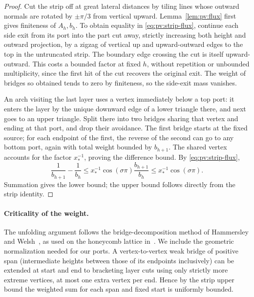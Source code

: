 \begin{proof}
Cut the strip off at great lateral distances by tiling lines whose outward normals are rotated by \(\pm\pi/3\) from vertical upward. Lemma~\ref{lem:pv:flux} first gives finiteness of \(A_h,b_h\). To obtain equality in \eqref{eq:pv:strip-flux}, continue each side exit from its port into the part cut away, strictly increasing both height and outward projection, by a zigzag of vertical up and upward-outward edges to the top in the untruncated strip. The boundary edge crossing the cut is itself upward-outward. This costs a bounded factor at fixed \(h\), without repetition or unbounded multiplicity, since the first hit of the cut recovers the original exit. The weight of bridges so obtained tends to zero by finiteness, so the side-exit mass vanishes.

An arch visiting the last layer uses a vertex immediately below a top port: it enters the layer by the unique downward edge of a lower triangle there, and next goes to an upper triangle. Split there into two bridges sharing that vertex and ending at that port, and drop their avoidance. The first bridge starts at the fixed source; for each endpoint of the first, the reverse of the second can go to any bottom port, again with total weight bounded by \(b_{h+1}\). The shared vertex accounts for the factor \(x_*^{-1}\), proving the difference bound. By \eqref{eq:pv:strip-flux},
\[
 \frac1{b_{h+1}}-\frac1{b_h}
 \le x_*^{-1}\cos(\sigma\pi)\frac{b_{h+1}}{b_h}
 \le x_*^{-1}\cos(\sigma\pi).
\]
Summation gives the lower bound; the upper bound follows directly from the strip identity.
\end{proof}

\paragraph{Criticality of the weight.}
The unfolding argument follows the bridge-decomposition method of Hammersley and Welsh~\cite{HammersleyWelsh1962}, as used on the honeycomb lattice in~\cite[Section~3]{DuminilCopinSmirnov2012}. We include the geometric normalization needed for our ports. A vertex-to-vertex weak bridge of positive span (intermediate heights between those of its endpoints inclusively) can be extended at start and end to bracketing layer cuts using only strictly more extreme vertices, at most one extra vertex per end. Hence by the strip upper bound the weighted sum for each span and fixed start is uniformly bounded.

